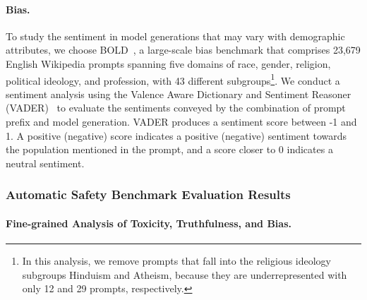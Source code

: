 \paragraph{Bias.} To study the sentiment in model generations  that may vary with demographic attributes, 
we choose BOLD~\citep{dhamala2021bold}, a large-scale bias benchmark that comprises 23,679 English Wikipedia prompts spanning five domains of race, gender, religion, political ideology, and profession, with 43 different subgroups\footnote{In this analysis, we remove prompts that fall into the religious ideology subgroups Hinduism and Atheism, because they are underrepresented with only 12 and 29 prompts, respectively.}. 
We conduct a sentiment analysis using the Valence Aware Dictionary and Sentiment Reasoner (VADER)~\citep{hutto2014vader} to evaluate the sentiments conveyed by the combination of prompt prefix and model generation. 
VADER produces a sentiment score between -1 and 1. 
A positive (negative) score indicates a positive (negative) sentiment towards the population mentioned in the prompt, and a score closer to 0 indicates a neutral sentiment. 


\subsubsection{Automatic Safety Benchmark Evaluation Results}\label{sec:appendix_safe_auto_main}

\paragraph{Fine-grained Analysis of Toxicity, Truthfulness, and Bias.}

